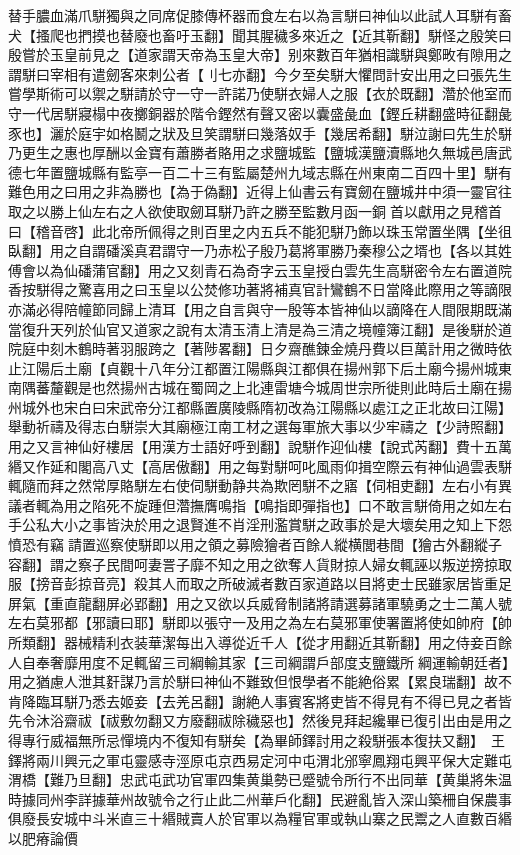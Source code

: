 替手膿血滿爪駢獨與之同席促膝傳杯器而食左右以為言駢曰神仙以此試人耳駢有畜犬【搔爬也捫摸也替廢也畜吁玉翻】聞其腥穢多來近之【近其靳翻】駢怪之殷笑曰殷嘗於玉皇前見之【道家謂天帝為玉皇大帝】别來數百年猶相識駢與鄭畋有隙用之謂駢曰宰相有遣劒客來刺公者【刂七亦翻】今夕至矣駢大懼問計安出用之曰張先生嘗學斯術可以禦之駢請於守一守一許諾乃使駢衣婦人之服【衣於既翻】濳於他室而守一代居駢寢榻中夜擲銅器於階令鏗然有聲又密以囊盛彘血【鏗丘耕翻盛時征翻彘豕也】灑於庭宇如格鬭之狀及旦笑謂駢曰幾落奴手【幾居希翻】駢泣謝曰先生於駢乃更生之惠也厚酬以金寶有蕭勝者賂用之求鹽城監【鹽城漢鹽瀆縣地久無城邑唐武德七年置鹽城縣有監亭一百二十三有監屬楚州九域志縣在州東南二百四十里】駢有難色用之曰用之非為勝也【為于偽翻】近得上仙書云有寶劒在鹽城井中須一靈官往取之以勝上仙左右之人欲使取劒耳駢乃許之勝至監數月函一銅首以獻用之見稽首曰【稽音啓】此北帝所佩得之則百里之内五兵不能犯駢乃飾以珠玉常置坐隅【坐徂臥翻】用之自謂磻溪真君謂守一乃赤松子殷乃葛將軍勝乃秦穆公之壻也【各以其姓傅會以為仙磻蒲官翻】用之又刻青石為奇字云玉皇授白雲先生高駢密令左右置道院香按駢得之驚喜用之曰玉皇以公焚修功著將補真官計鸞鶴不日當降此際用之等謫限亦滿必得陪幢節同歸上清耳【用之自言與守一殷等本皆神仙以謫降在人間限期既滿當復升天列於仙官又道家之說有太清玉清上清是為三清之境幢簿江翻】是後駢於道院庭中刻木鶴時著羽服跨之【著陟畧翻】日夕齋醮鍊金燒丹費以巨萬計用之微時依止江陽后土廟【貞觀十八年分江都置江陽縣與江都俱在揚州郭下后土廟今揚州城東南隅蕃釐觀是也然揚州古城在蜀岡之上北連雷塘今城周世宗所徙則此時后土廟在揚州城外也宋白曰宋武帝分江都縣置廣陵縣隋初改為江陽縣以處江之正北故曰江陽】舉動祈禱及得志白駢崇大其廟極江南工材之選每軍旅大事以少牢禱之【少詩照翻】用之又言神仙好樓居【用漢方士語好呼到翻】說駢作迎仙樓【說式芮翻】費十五萬緡又作延和閣高八丈【高居傲翻】用之每對駢呵叱風雨仰揖空際云有神仙過雲表駢輒隨而拜之然常厚賂駢左右使伺駢動静共為欺罔駢不之寤【伺相吏翻】左右小有異議者輒為用之陷死不旋踵但濳撫膺鳴指【鳴指即彈指也】口不敢言駢倚用之如左右手公私大小之事皆決於用之退賢進不肖淫刑濫賞駢之政事於是大壞矣用之知上下怨憤恐有竊請置巡察使駢即以用之領之募險獪者百餘人縱横閭巷間【獪古外翻縱子容翻】謂之察子民間呵妻詈子靡不知之用之欲奪人貨財掠人婦女輒誣以叛逆搒掠取服【搒音彭掠音亮】殺其人而取之所破滅者數百家道路以目將吏士民雖家居皆重足屏氣【重直龍翻屏必郢翻】用之又欲以兵威脅制諸將請選募諸軍驍勇之士二萬人號左右莫邪都【邪讀曰耶】駢即以張守一及用之為左右莫邪軍使署置將使如帥府【帥所類翻】器械精利衣装華潔每出入導從近千人【從才用翻近其靳翻】用之侍妾百餘人自奉奢靡用度不足輒留三司綱輸其家【三司綱謂戶部度支鹽鐵所綱運輸朝廷者】用之猶慮人泄其姧謀乃言於駢曰神仙不難致但恨學者不能絶俗累【累良瑞翻】故不肯降臨耳駢乃悉去姬妾【去羌呂翻】謝絶人事賓客將吏皆不得見有不得已見之者皆先令沐浴齋祓【祓敷勿翻又方廢翻祓除穢惡也】然後見拜起纔畢已復引出由是用之得專行威福無所忌憚境内不復知有駢矣【為畢師鐸討用之殺駢張本復扶又翻】　王鐸將兩川興元之軍屯靈感寺涇原屯京西易定河中屯渭北邠寧鳳翔屯興平保大定難屯渭橋【難乃旦翻】忠武屯武功官軍四集黄巢勢已蹙號令所行不出同華【黄巢將朱温時據同州李詳據華州故號令之行止此二州華戶化翻】民避亂皆入深山築柵自保農事俱廢長安城中斗米直三十緡賊賣人於官軍以為糧官軍或執山寨之民鬻之人直數百緡以肥瘠論價

